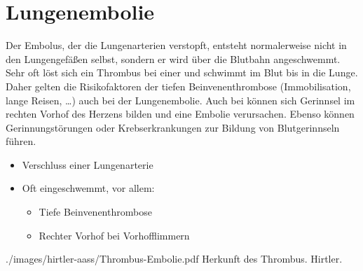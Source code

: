 
\nocite{Knacke200601}


\section{Lungenembolie}
\label{topic:lungenembolie}



{%
Der Embolus, der die Lungenarterien verstopft, entsteht
normalerweise nicht in den Lungengefäßen selbst, sondern er
wird über die Blutbahn angeschwemmt. Sehr oft löst sich ein Thrombus bei
einer  und schwimmt im Blut bis in
die Lunge. Daher gelten die
Risikofaktoren der tiefen Beinvenenthrombose
(Immobilisation, lange Reisen, \ldots) auch bei der
Lungenembolie. 
Auch bei  können sich Gerinnsel im 
rechten Vorhof des Herzens bilden und eine Embolie verursachen.
Ebenso können
Gerinnungstörungen oder Krebserkrankungen zur Bildung von 
Blutgerinnseln führen.
}{
\begin{itemize}
  \item Verschluss einer Lungenarterie
  \item Oft eingeschwemmt, vor allem:
  \begin{itemize}
    \item Tiefe Beinvenenthrombose
    \item Rechter Vorhof bei Vorhofflimmern
  \end{itemize}
\end{itemize}
}
{./images/hirtler-aass/Thrombus-Embolie.pdf}
{Herkunft des Thrombus.}
{Hirtler.}




